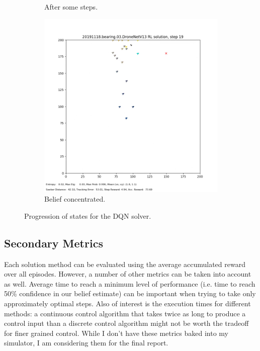 \documentclass[10pt,twocolumn,letterpaper]{article}
\begin{document}
\begin{figure}[h!]
\begin{subfigure}[b]{0.48\linewidth}
    \caption{After some steps.}
  \end{subfigure}
  \begin{subfigure}[b]{0.48\linewidth}
    \includegraphics[width=\linewidth]{images/seventh.png}
    \caption{Belief concentrated.}
  \end{subfigure}
  \caption{Progression of states for the DQN solver.}
  \label{fig:dqn}
\end{figure}



\subsection{Secondary Metrics}
Each solution method can be evaluated using the average accumulated reward over all episodes.
However, a number of other metrics can be taken into account as well.
Average time to reach a minimum level of performance (i.e. time to reach 50\% confidence in our belief estimate) can be important when trying to take only approximately optimal steps.
Also of interest is the execution times for different methods: a continuous control algorithm that takes twice as long to produce a control input than a discrete control algorithm might not be worth the tradeoff for finer grained control.
While I don't have these metrics baked into my simulator, I am considering them for the final report.
\end{document}

